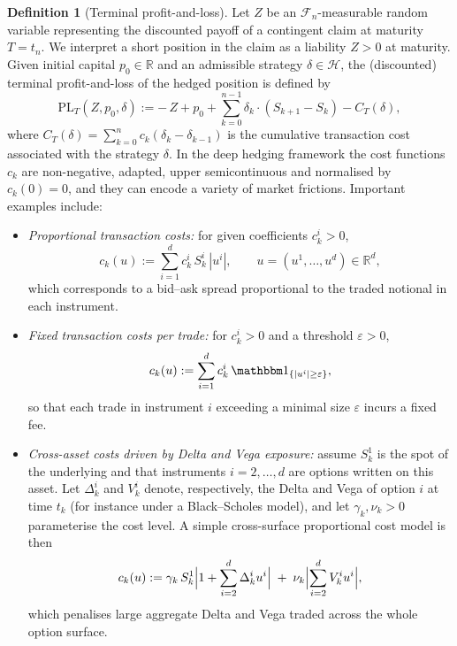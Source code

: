 \documentclass[12pt,a4paper]{article}
\theoremstyle{definition}
\newtheorem{definition}{Definition}[section]
\theoremstyle{plain}
\theoremstyle{remark}
\theoremstyle{plain}
\begin{document}
\begin{definition}[Terminal profit-and-loss]
\label{def:terminal_PL}
Let $Z$ be an $\mathcal F_n$-measurable random variable representing the discounted payoff of a contingent claim at maturity $T=t_n$. 
We interpret a short position in the claim as a liability $Z>0$ at maturity.
Given initial capital $p_0\in\mathbb R$ and an admissible strategy $\delta\in\mathcal H$, the (discounted) terminal profit-and-loss of the hedged position is defined by
\begin{equation}
\label{eq:terminal_PL_compact}
    \mathrm{PL}_T(Z,p_0,\delta)
    :=
    -\,Z + p_0 
    + \sum_{k=0}^{n-1} \delta_k \cdot (S_{k+1} - S_k)
    - C_T(\delta),
\end{equation}
where $C_T(\delta)=\sum_{k=0}^{n} c_k(\delta_k-\delta_{k-1})$ is the cumulative transaction cost associated with the strategy $\delta$.
In the deep hedging framework \cite{Buehler2019DeepHedging} the cost functions $c_k$ are non-negative, adapted, upper semicontinuous and normalised by $c_k(0)=0$, and they can encode a variety of market frictions. 
Important examples include:
\begin{itemize}
    \item \emph{Proportional transaction costs:} for given coefficients $c_k^i>0$,
    \[
        c_k(u) := \sum_{i=1}^d c_k^i\, S_k^i\, |u^i|, \qquad u=(u^1,\dots,u^d)\in\mathbb R^d,
    \]
    which corresponds to a bid--ask spread proportional to the traded notional in each instrument.
    \item \emph{Fixed transaction costs per trade:} for $c_k^i>0$ and a threshold $\varepsilon>0$,
    \[
        c_k(u) := \sum_{i=1}^d c_k^i\, \mathbbm 1_{\{|u^i|\ge \varepsilon\}},
    \]
    so that each trade in instrument $i$ exceeding a minimal size $\varepsilon$ incurs a fixed fee.
    \item \emph{Cross-asset costs driven by Delta and Vega exposure:} assume $S_k^1$ is the spot of the underlying and that instruments $i=2,\dots,d$ are options written on this asset.
    Let $\Delta_k^i$ and $V_k^i$ denote, respectively, the Delta and Vega of option $i$ at time $t_k$ (for instance under a Black--Scholes model), and let $\gamma_k,\nu_k>0$ parameterise the cost level.
    A simple cross-surface proportional cost model is then
    \[
        c_k(u)
        := \gamma_k\, S_k^1 \Bigl| 1 + \sum_{i=2}^d \Delta_k^i u^i \Bigr|
         \;+\; \nu_k \Bigl| \sum_{i=2}^d V_k^i u^i \Bigr|,
    \]
    which penalises large aggregate Delta and Vega traded across the whole option surface.
\end{itemize}
\end{definition}
\end{document}
